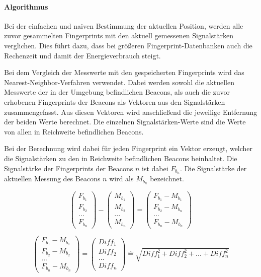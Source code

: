 \paragraph{Algorithmus}
\label{sec:}
Bei der einfachen und naiven Bestimmung der aktuellen Position, werden alle zuvor gesammelten Fingerprints mit den aktuell gemessenen Signalstärken verglichen. Dies führt dazu, dass bei größeren Fingerprint-Datenbanken auch die Rechenzeit und damit der Energieverbrauch steigt. 

Bei dem Vergleich der Messwerte mit den gespeicherten Fingerprints wird das Nearest-Neighbor-Verfahren verwendet. Dabei werden sowohl die aktuellen Messwerte der in der Umgebung befindlichen Beacons, als auch die zuvor erhobenen Fingerprints der Beacons als Vektoren aus den Signalstärken zusammengefasst. Aus diesen Vektoren wird anschließend die jeweilige Entfernung der beiden Werte berechnet. Die einzelnen Signalstärken-Werte sind die Werte von allen in Reichweite befindlichen Beacons.

Bei der Berechnung wird dabei für jeden Fingerprint ein Vektor erzeugt, welcher die Signalstärken zu den in Reichweite befindlichen Beacons beinhaltet.
Die Signalstärke der Fingerprints der Beacons $n$ ist dabei $F_{b_n}$.
Die Signalstärke der aktuellen Messung des Beacons $n$ wird als $M_{b_n}$ bezeichnet.


\begin{equation}
	\begin{pmatrix}
		F_{b_1} \\
		F_{b_2} \\
		... \\
		F_{b_n}
	\end{pmatrix} -
	\begin{pmatrix}
		M_{b_1} \\
		M_{b_2} \\
		... \\
		M_{b_n}
	\end{pmatrix}
	= 
	\begin{pmatrix}
		F_{b_1} - M_{b_1} \\
		F_{b_2} - M_{b_n} \\
		... \\
		F_{b_n} - M_{b_n}
	\end{pmatrix}
\end{equation}

\begin{equation}
	\begin{pmatrix}
		F_{b_1} - M_{b_1} \\
		F_{b_2} - M_{b_2} \\
		... \\
		F_{b_n} - M_{b_n}
	\end{pmatrix}
	=
	\begin{pmatrix}
		Diff_1 \\
		Diff_2 \\
		... \\
		Diff_n
	\end{pmatrix}
	\widehat{=}
	\sqrt{Diff_1^2 + Diff_2^2 + ... + Diff_n^2}
\end{equation}

